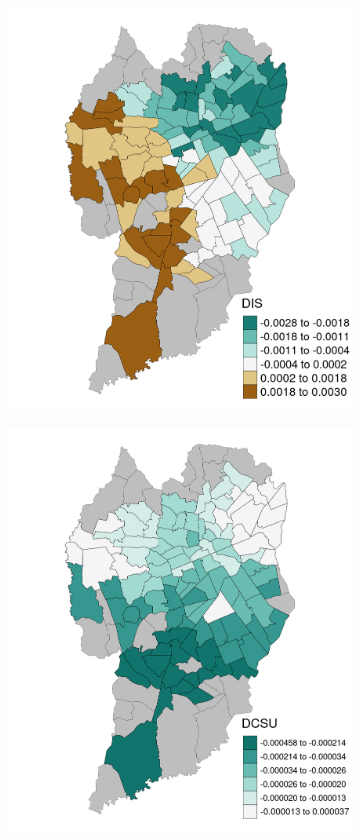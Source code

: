 \begin{figure}[!htbp]
    \centering\footnotesize
    \captionsetup{font=footnotesize}
    \caption{DIS AND DCSU COEFFICIENT ESTIMATES}
    \begin{subfigure}{0.5\textwidth}
        \includegraphics{fig/DIS.png}
    \end{subfigure}%
    \begin{subfigure}{0.5\textwidth}
        \includegraphics{fig/DCSU.png}

\end{subfigure}
\end{figure}
